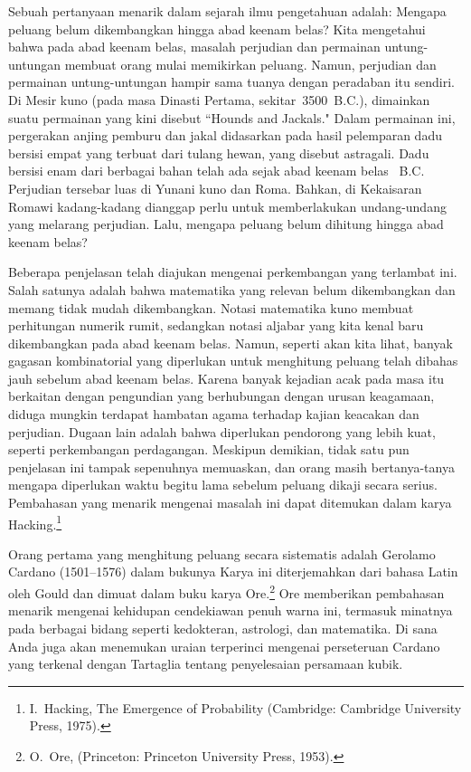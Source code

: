 Sebuah pertanyaan menarik dalam sejarah ilmu pengetahuan adalah: Mengapa peluang belum
dikembangkan hingga abad keenam belas?  Kita mengetahui bahwa pada abad keenam belas,
masalah perjudian dan permainan untung-untungan membuat orang mulai memikirkan
peluang.  Namun, perjudian dan permainan untung-untungan hampir sama tuanya dengan
peradaban itu sendiri.  Di Mesir kuno (pada masa Dinasti Pertama,
sekitar~3500~{\footnotesize\rm {B.C.}}), dimainkan suatu permainan yang kini disebut ``Hounds and Jackals."
Dalam permainan ini, pergerakan anjing pemburu dan jakal didasarkan pada hasil
pelemparan
dadu bersisi empat yang terbuat dari tulang hewan, yang disebut astragali. 
Dadu bersisi
enam dari berbagai bahan telah ada sejak abad keenam belas
~{\footnotesize\rm {B.C.}}  Perjudian
tersebar luas di Yunani kuno dan Roma.  Bahkan, 
di Kekaisaran Romawi kadang-kadang
dianggap perlu untuk memberlakukan undang-undang yang melarang perjudian.  Lalu, mengapa
peluang belum dihitung hingga abad keenam belas?

Beberapa penjelasan telah diajukan mengenai perkembangan yang terlambat ini.  Salah satunya adalah
bahwa
matematika yang relevan belum dikembangkan dan memang tidak mudah dikembangkan.  Notasi
matematika kuno membuat perhitungan numerik rumit, sedangkan notasi aljabar yang
kita kenal baru dikembangkan pada abad keenam belas. 
Namun, seperti akan kita lihat, banyak gagasan kombinatorial yang diperlukan untuk menghitung
peluang telah dibahas jauh sebelum abad keenam belas.  Karena banyak
kejadian acak pada masa itu berkaitan dengan pengundian yang berhubungan dengan
urusan
keagamaan, diduga mungkin terdapat hambatan agama terhadap
kajian keacakan dan perjudian.  Dugaan lain adalah bahwa diperlukan
pendorong yang lebih kuat, seperti perkembangan perdagangan.  Meskipun demikian, tidak satu pun
penjelasan ini tampak sepenuhnya memuaskan, dan orang masih bertanya-tanya
mengapa diperlukan waktu begitu lama sebelum peluang dikaji secara serius.  Pembahasan yang
menarik mengenai masalah ini dapat ditemukan dalam karya Hacking.\footnote{I.~Hacking,
\emx
{The Emergence of Probability} (Cambridge: Cambridge University Press,
1975).}
\par
Orang pertama yang menghitung peluang secara sistematis adalah Gerolamo
Cardano
(1501--1576) dalam bukunya   Karya ini diterjemahkan dari
bahasa Latin oleh Gould dan dimuat dalam buku 
karya Ore.\footnote{O.~Ore, 
(Princeton:
Princeton University Press, 1953).}  Ore memberikan pembahasan menarik mengenai
kehidupan cendekiawan penuh warna ini, termasuk minatnya pada berbagai
bidang seperti kedokteran, astrologi, dan matematika.  Di sana Anda juga akan
menemukan uraian terperinci mengenai perseteruan Cardano yang terkenal dengan Tartaglia
tentang penyelesaian persamaan kubik.

